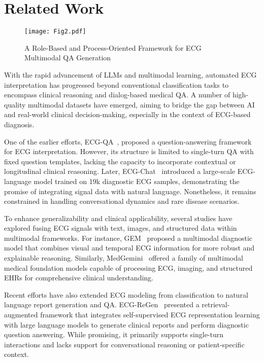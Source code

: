\section{Related Work}
\label{sec2}
\begin{figure*}[h]
    \centering
    \texttt{[image: Fig2.pdf]}
    \label{fig2}
    \caption{A Role-Based and Process-Oriented Framework for ECG Multimodal QA Generation}
\end{figure*}

With the rapid advancement of LLMs and multimodal learning, automated ECG interpretation has progressed beyond conventional classification tasks to encompass clinical reasoning and dialog-based medical QA. A number of high-quality multimodal datasets have emerged, aiming to bridge the gap between AI and real-world clinical decision-making, especially in the context of ECG-based diagnosis.

One of the earlier efforts, ECG-QA~\cite{bib1}, proposed a question-answering framework for ECG interpretation. However, its structure is limited to single-turn QA with fixed question templates, lacking the capacity to incorporate contextual or longitudinal clinical reasoning. Later, ECG-Chat~\cite{bib2} introduced a large-scale ECG-language model trained on 19k diagnostic ECG samples, demonstrating the promise of integrating signal data with natural language. Nonetheless, it remains constrained in handling conversational dynamics and rare disease scenarios.

To enhance generalizability and clinical applicability, several studies have explored fusing ECG signals with text, images, and structured data within multimodal frameworks. For instance, GEM~\cite{bib3} proposed a multimodal diagnostic model that combines visual and temporal ECG information for more robust and explainable reasoning. Similarly, MedGemini~\cite{bib4} offered a family of multimodal medical foundation models capable of processing ECG, imaging, and structured EHRs for comprehensive clinical understanding.

Recent efforts have also extended ECG modeling from classification to natural language report generation and QA. ECG-ReGen~\cite{bibReGen} presented a retrieval-augmented framework that integrates self-supervised ECG representation learning with large language models to generate clinical reports and perform diagnostic question answering. While promising, it primarily supports single-turn interactions and lacks support for conversational reasoning or patient-specific context.


